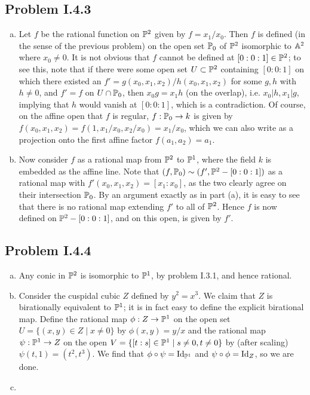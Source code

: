 \documentclass{mathnotes}
\begin{document}
\subsection*{Problem I.4.3}
\begin{enumerate}[(a)]
    \item Let $f$ be the rational function on $\mathbb{P}^2$ given by $f=x_1/x_0$. Then $f$ is defined
        (in the sense of the previous problem) on the open set $\mathbb{P}_0$ of $\mathbb{P}^2$ isomorphic to $\mathbb{A}^2$
        where $x_0\neq 0$. It is not obvious that $f$ cannot be defined at $[0:0:1]\in\mathbb{P}^2$; to see
        this, note that if there were some open set $U\subset\mathbb{P}^2$ containing $[0:0:1]$ on which
        there existed an $f'=g(x_0,x_1,x_2)/h(x_0,x_1,x_2)$ for some $g,h$ with $h\neq 0$, and $f'=f$
        on $U\cap\mathbb{P}_0$, then $x_0g=x_1h$ (on the overlap), i.e. $x_0|h, x_1|g$,
        implying that $h$ would vanish at $[0:0:1]$, which is a contradiction. Of course, on the affine
        open that $f$ is regular, $f:\mathbb{P}_0\to k$ is given by $f(x_0,x_1,x_2)=f(1,x_1/x_0,x_2/x_0)=x_1/x_0$,
        which we can also write as a projection onto the first affine factor $f(a_1,a_2)=a_1$.
    \item Now consider $f$ as a rational map from $\mathbb{P}^2$ to $\mathbb{P}^1$, where the field $k$ is
        embedded as the affine line. Note that $(f,\mathbb{P}_0)\sim(f',\mathbb{P}^2-[0:0:1])$ as a rational map
        with $f'(x_0,x_1,x_2)=[x_1:x_0]$, as the two clearly agree on their intersection $\mathbb{P}_0$.
        By an argument exactly as in part (a), it is easy to see that there is no rational map
        extending $f'$ to all of $\mathbb{P}^2$. Hence $f$ is now defined on $\mathbb{P}^2-[0:0:1]$, and on
        this open, is given by $f'$.
\end{enumerate}

\subsection*{Problem I.4.4}

\begin{enumerate}[(a)]
    \item Any conic in $\mathbb{P}^2$ is isomorphic to $\mathbb{P}^1$, by problem I.3.1, and hence
        rational.
    \item Consider the cuspidal cubic $Z$ defined by $y^2=x^3$. We claim that $Z$ is birationally
        equivalent to $\mathbb{P}^1$; it is in fact easy to define the explicit birational map.
        Define the rational map $\phi:Z\to\mathbb{P}^1$ on the open set $U=\{(x,y)\in Z\mid x\neq 0\}$ by
        $\phi(x,y)=y/x$ and the rational map $\psi:\mathbb{P}^1\to Z$ on the open $V=\{[t:s]\in\mathbb{P}^1\mid s\neq0,t\neq 0\}$
        by (after scaling) $\psi(t,1)=(t^2,t^3)$. We find that $\phi\circ\psi=\operatorname{Id}_{\mathbb{P}^1}$ and
        $\psi\circ\phi=\operatorname{Id}_{Z}$, so we are done.
    \item {}
\end{enumerate}
\end{document}
